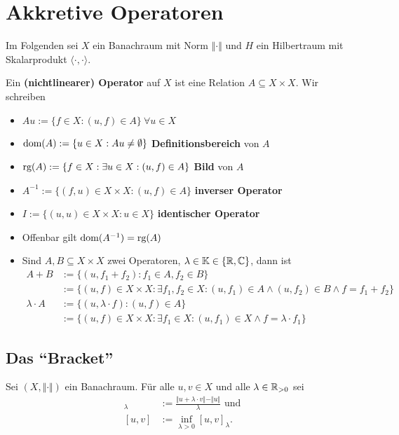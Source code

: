 
\chapter{Akkretive Operatoren}
Im Folgenden sei $X$ ein Banachraum mit Norm $\Vert\cdot\Vert$ und $H$ ein Hilbertraum mit Skalarprodukt $\langle\cdot,\cdot\rangle$.

\begin{definition}
Ein \textbf{(nichtlinearer) Operator} auf $X$ ist eine Relation $A\subseteq X\times X$. Wir schreiben
\begin{itemize}
\item $Au:=\lbrace f\in X:(u,f)\in A\rbrace~\forall u\in X$
\item $\text{dom}(A):=\lbrace u\in X:Au\neq\emptyset\rbrace$ \textbf{Definitionsbereich} von $A$
\item $\text{rg}(A):=\lbrace f\in X:\exists u\in X:(u,f)\in A\rbrace$ \textbf{Bild} von $A$
\item $A^{-1}:=\lbrace (f,u)\in X\times X:(u,f)\in A\rbrace$ \textbf{inverser Operator}
\item $I:=\lbrace(u,u)\in X\times X:u\in X\rbrace$ \textbf{identischer Operator}
\item Offenbar gilt $\text{dom}(A^{-1})=\text{rg}(A)$
\item Sind $A,B\subseteq X\times X$ zwei Operatoren, $\lambda\in\mathbb{K}\in\lbrace\mathbb{R},\mathbb{C}\rbrace$, dann ist
\begin{align*}
A+B&:=\lbrace(u,f_1+f_2):f_1\in A,f_2\in B\rbrace\\
&:=\lbrace(u,f)\in X\times X:\exists f_1,f_2\in X:(u,f_1)\in A\wedge(u,f_2)\in B\wedge f=f_1+f_2\rbrace\\
\lambda\cdot A&:=\lbrace(u,\lambda\cdot f):(u,f)\in A\rbrace\\
&:=\lbrace(u,f)\in X\times X:\exists f_1\in X:(u,f_1)\in X\wedge f=\lambda\cdot f_1\rbrace
\end{align*}
\end{itemize}
\end{definition}

\section{Das ``Bracket''}
Sei $(X,\Vert\cdot\Vert)$ ein Banachraum. Für alle $u,v\in X$ und alle $\lambda\in\mathbb{R}_{>0}$ sei
\begin{align*}
[u,v]_\lambda&:=\frac{\Vert u+\lambda\cdot v\Vert-\Vert u\Vert}{\lambda}\text{ und}\\
[u,v]&:=\inf\limits_{\lambda>0}[u,v]_\lambda.
\end{align*}

